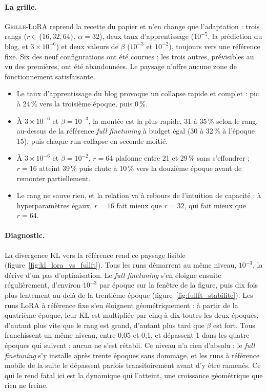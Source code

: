 \documentclass[11pt,a4paper]{article}
\begin{document}
\paragraph{La grille.} \textsc{Grille-LoRA} reprend la recette du papier et n'en change que l'adaptation : trois rangs ($r \in \{16, 32, 64\}$, $\alpha = 32$), deux taux d'apprentissage ($10^{-5}$, la prédiction du blog, et $3 \times 10^{-6}$) et deux valeurs de $\beta$ ($10^{-3}$ et $10^{-2}$), toujours vers une référence fixe. Six des neuf configurations ont été courues ; les trois autres, prévisibles au vu des premières, ont été abandonnées. Le paysage n'offre aucune zone de fonctionnement satisfaisante.

\begin{itemize}
    \item Le taux d'apprentissage du blog provoque un collapse rapide et complet : pic à 24\,\% vers la troisième époque, puis 0\,\%.
    \item À $3 \times 10^{-6}$ et $\beta = 10^{-3}$, la montée est la plus rapide, 31 à 35\,\% selon le rang, au-dessus de la référence \emph{full finetuning} à budget égal (30 à 32\,\% à l'époque 15), puis chaque run collapse en seconde moitié.
    \item À $3 \times 10^{-6}$ et $\beta = 10^{-2}$, $r=64$ plafonne entre 21 et 29\,\% sans s'effondrer ; $r=16$ atteint 39\,\% puis chute à 10\,\% vers la douzième époque avant de remonter partiellement.
    \item Le rang ne sauve rien, et la relation va à rebours de l'intuition de capacité : à hyperparamètres égaux, $r=16$ fait mieux que $r=32$, qui fait mieux que $r=64$.
\end{itemize}

\paragraph{Diagnostic.} La divergence KL vers la référence rend ce paysage lisible (figure~\ref{fig:kl_lora_vs_fullft}). Tous les runs démarrent au même niveau, $10^{-3}$, la dérive d'un pas d'optimisation. Le \emph{full finetuning} s'en éloigne ensuite régulièrement, d'environ $10^{-3}$ par époque sur la fenêtre de la figure, puis dix fois plus lentement au-delà de la trentième époque (figure~\ref{fig:fullft_stabilite}). Les runs LoRA à référence fixe s'en éloignent géométriquement : à partir de la quatrième époque, leur KL est multipliée par cinq à dix toutes les deux époques, d'autant plus vite que le rang est grand, d'autant plus tard que $\beta$ est fort. Tous franchissent un même niveau, entre 0{,}05 et 0{,}1, et dépassent 1 dans les quatre époques qui suivent ; aucun ne s'est rétabli. Ce niveau n'a rien d'absolu : le \emph{full finetuning} s'y installe après trente époques sans dommage, et les runs à référence mobile de la suite le dépassent parfois transitoirement avant d'y être ramenés. Ce qui le rend fatal ici est la dynamique qui l'atteint, une croissance géométrique que rien ne freine. 
\end{document}

